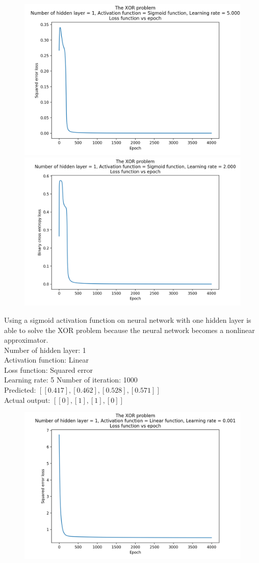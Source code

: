 \documentclass[12pt]{amsart}
\begin{document}
\begin{figure}[h]
\includegraphics[width=0.49\columnwidth]{xor_sigmoid_mse.png}
\includegraphics[width=0.49\columnwidth]{xor_sigmoid_bce.png}
\end{figure}

Using a sigmoid activation function on neural network with one hidden layer is able to solve the XOR problem because the neural network becomes a nonlinear approximator. \\

Number of hidden layer: 1 \\
Activation function: Linear \\
Loss function: Squared error\\
Learning rate: 5
Number of iteration: 1000 \\
Predicted: $[[0.417], [0.462], [0.528], [0.571]]$ \\
Actual output: $[[0],[1],[1],[0]]$ \\

\begin{figure}[h]
\includegraphics[width=0.49\columnwidth, left]{xor_linear_mse.png}
\end{figure}
\end{document}
